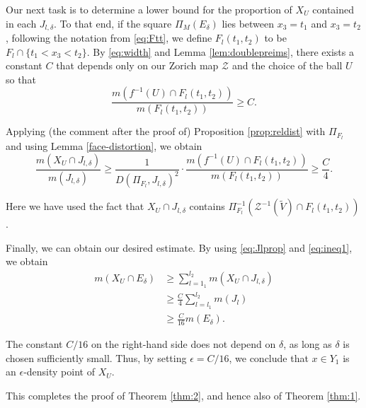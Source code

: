 \documentclass[11pt]{amsart}
\numberwithin{equation}{section}
\theoremstyle{definition}
\theoremstyle{definition}
\theoremstyle{definition}
\begin{document}
Our next task is to determine a lower bound for the proportion of $X_U$ contained in each $J_{l,\delta}$. To that end, if the square $\Pi_M(E_{\delta})$ lies between $x_3 = t_1$ and $x_3 = t_2$, following the notation from \eqref{eq:Ftt}, we define $F_l(t_1,t_2)$ to be $F_l \cap \{ t_1<x_3<t_2 \}$. By \eqref{eq:width} and Lemma \ref{lem:doublepreims}, there exists a constant $C$ that depends only on our Zorich map $\mathcal{Z}$ and the choice of the ball $U$ so that
\[ \frac{ m(f^{-1}(U) \cap F_l(t_1,t_2) ) }{m(F_l(t_1,t_2))} \geq C. \]

Applying (the comment after the proof of) Proposition \ref{prop:reldist} with $\Pi_{F_l}$ and using Lemma \ref{face-distortion}, we obtain
\begin{equation}
\label{eq:ineq1}
    \frac{ m(X_U \cap J_{l,\delta})}{m(J_{l,\delta})} \geq \frac{ 1}{D(\Pi_{F_l} , J_{l,\delta})^2} \cdot \frac{ m(f^{-1}(U) \cap F_l(t_1,t_2) ) }{m(F_l(t_1,t_2))} \geq \frac{C}{4}.
\end{equation}

Here we have used the fact that $X_U \cap J_{l,\delta}$ contains $\Pi_{F_l}^{-1} (\mathcal{Z}^{-1}(\widetilde{V})\cap F_l(t_1,t_2)) $. 

Finally, we can obtain our desired estimate. By using \eqref{eq:Jlprop} and \eqref{eq:ineq1}, we obtain
\begin{align*}
m(X_U \cap E_{\delta}) &\geq \sum_{l=1_1}^{l_2} m(X_U \cap J_{l,\delta}) \\
&\geq \frac{C}{4} \sum_{l=l_1}^{l_2}  m(J_l) \\
&\geq \frac{C}{16 } m(E_{\delta}).
\end{align*}

The constant $C/16$ on the right-hand side does not depend on $\delta$, as long as $\delta$ is chosen sufficiently small. Thus, by setting $\epsilon = C/16$, we conclude that $x \in Y_1$ is an $\epsilon$-density point of $X_U$.

This completes the proof of Theorem \ref{thm:2}, and hence also of Theorem \ref{thm:1}.
\end{document}
